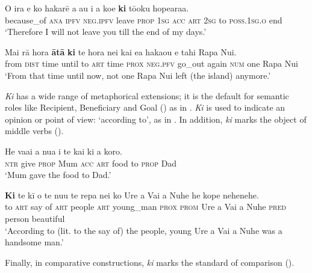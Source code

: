 \ea\label{ex:4.266}
\gll {\ꞌ}O ira e ko hakarē a au i a koe \textbf{ki} tō{\ꞌ}oku hope{\ꞌ}ara{\ꞌ}a.\\
because\_of \textsc{ana} \textsc{ipfv} \textsc{neg.ipfv} leave \textsc{prop} \textsc{1sg} \textsc{acc} \textsc{art} \textsc{2sg} to \textsc{poss.1sg.o} end\\

\glt 
‘Therefore I will not leave you till the end of my days.’ \textstyleExampleref{[R474.010]} 
\z

\ea\label{ex:4.267}
\gll Mai rā hora \textbf{{\ꞌ}ātā} \textbf{ki} te hora nei kai e{\ꞌ}a haka{\ꞌ}ou e tahi Rapa Nui.\\
from \textsc{dist} time until to \textsc{art} time \textsc{prox} \textsc{neg.pfv} go\_out again \textsc{num} one Rapa Nui\\

\glt 
‘From that time until now, not one Rapa Nui left (the island) anymore.’ \textstyleExampleref{[R303.211]} 
\z

\textit{Ki} has a wide range of metaphorical extensions; it is the default  for semantic roles like Recipient, Beneficiary and Goal () as in . \textit{Ki} is used to indicate an opinion or point of view: ‘according to’, as in . In addition, \textit{ki} marks the object of middle verbs ().

\ea\label{ex:4.268}
\gll He va{\ꞌ}ai a nua i te kai ki a koro. \\
\textsc{ntr} give \textsc{prop} Mum \textsc{acc} \textsc{art} food to \textsc{prop} Dad \\

\glt 
‘Mum gave the food to Dad.’ \textstyleExampleref{[R236.078]} 
\z

\ea\label{ex:4.269}
\gll \textbf{Ki} te kī o te nu{\ꞌ}u te repa nei ko Ure {\ꞌ}a Vai {\ꞌ}a Nuhe  he kope nehenehe.\\
to \textsc{art} say of \textsc{art} people \textsc{art} young\_man \textsc{prox} \textsc{prom} Ure a Vai a Nuhe  \textsc{pred} person beautiful\\

\glt
‘According to (lit. to the say of) the people, young Ure a Vai a Nuhe was a handsome man.’ \textstyleExampleref{[R532-07.006]}
\z

Finally, in comparative constructions, \textit{ki} marks the standard of comparison (). 
